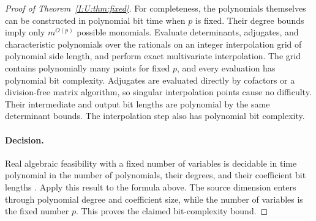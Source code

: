 \begin{proof}[Proof of Theorem~\ref{I:U:thm:fixed}]
For completeness, the polynomials themselves can be constructed in
polynomial bit time when $p$ is fixed.  Their degree bounds imply only
$m^{O(p)}$ possible monomials.  Evaluate determinants, adjugates, and
characteristic polynomials over the rationals on an integer
interpolation grid of polynomial side length, and perform exact
multivariate interpolation.  The grid contains polynomially many
points for fixed $p$, and every evaluation has polynomial bit
complexity.  Adjugates are evaluated directly by cofactors or a
division-free matrix algorithm, so singular interpolation points cause
no difficulty.  Their intermediate and output bit lengths are
polynomial by the same determinant bounds.  The interpolation step
also has polynomial bit complexity.

\paragraph{Decision.}
Real algebraic feasibility with a fixed number of variables is
decidable in time polynomial in the number of polynomials, their
degrees, and their coefficient bit lengths
\cite{renegar1992,basu2006}.  Apply this result to the formula above.
The source dimension enters through polynomial degree and coefficient
size, while the number of variables is the fixed number $p$.
This proves the claimed bit-complexity bound.
\end{proof}
